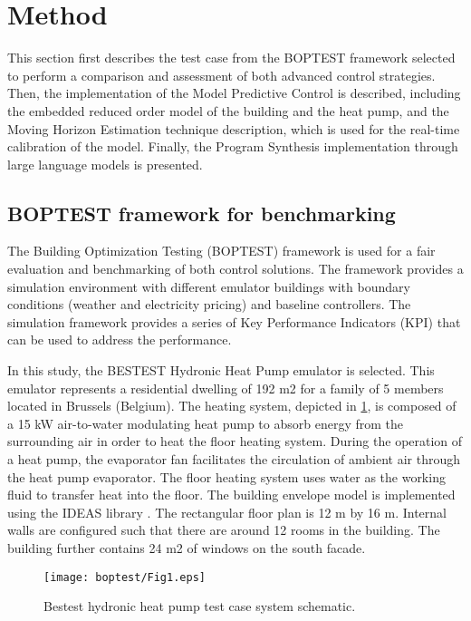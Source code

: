 \section{Method}
\label{sec:method}
This section first describes the test case from the BOPTEST framework selected to perform a comparison and assessment of both advanced control strategies. Then, the implementation of the Model Predictive Control is described, including the embedded reduced order model of the building and the heat pump, and the Moving Horizon Estimation technique description, which is used for the real-time calibration of the model. Finally, the Program Synthesis implementation through large language models is presented.


\subsection{BOPTEST framework for benchmarking}
\label{sec:BOPTEST}
The Building Optimization Testing (BOPTEST) framework \cite{Blum2021} is used for a fair evaluation and benchmarking of both control solutions. The framework provides a simulation environment with different emulator buildings with boundary conditions (weather and electricity pricing) and baseline controllers. The simulation framework provides a series of Key Performance Indicators (KPI) that can be used to address the performance.

In this study, the BESTEST Hydronic Heat Pump emulator is selected. This emulator represents a residential dwelling of 192 m2 for a family of 5 members located in Brussels (Belgium).  The heating system, depicted in \ref{fig:1}, is composed of a 15 kW air-to-water modulating heat pump to absorb energy from the surrounding air in order to heat the floor heating system. During the operation of a heat pump, the evaporator fan facilitates the circulation of ambient air through the heat pump evaporator. The floor heating system uses water as the working fluid to transfer heat into the floor. The building envelope model is implemented using the IDEAS library \cite{Jorissen2018}. The rectangular floor plan is 12 m by 16 m. Internal walls are configured such that there are around 12 rooms in the building. The building further contains 24 m2 of windows on the south facade.

\begin{figure}
  \texttt{[image: boptest/Fig1.eps]}
\caption{Bestest hydronic heat pump test case system schematic.}
\label{fig:1}       %
\end{figure}
%

